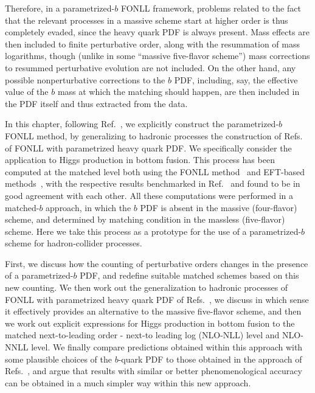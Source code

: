 Therefore, in a parametrized-$b$ FONLL framework, problems
related to the fact that the relevant processes in a massive scheme start
at higher order is thus completely
evaded, since the heavy quark 
PDF is always present. Mass effects are then included to finite
perturbative order, along with the resummation of mass logarithms, though
(unlike in some  ``massive five-flavor scheme'') mass corrections to
resummed perturbative evolution are not included. On the other hand,
any possible nonperturbative corrections to the $b$ PDF, including,
say, the effective value of the $b$ mass at which the matching should
happen, are then included in the PDF itself and thus extracted from
the data.

In this chapter, following Ref.~\cite{Forte:2019hjc}, we explicitly construct the parametrized-$b$ FONLL method, by
generalizing to hadronic processes the construction 
of Refs.~\cite{Ball:2015tna,Ball:2015dpa} of FONLL  with
parametrized heavy quark PDF. We specifically consider the
application to Higgs production in bottom fusion. This process has
been computed at the matched level both using the FONLL
method~\cite{Forte:2015hba,Forte:2016sja} and EFT-based
methods~\cite{Bonvini:2015pxa,Bonvini:2016fgf}, with the respective results
benchmarked in
Ref.~\cite{deFlorian:2016spz} and found to be in good agreement with
each other. All these computations were performed
in a matched-$b$ approach, in which the $b$ PDF  is absent in the
massive (four-flavor) scheme, and determined by matching condition in
the massless (five-flavor) scheme. Here we  take this process as
a prototype for the use of a parametrized-$b$  scheme
for hadron-collider processes.

First, we discuss how the counting of perturbative orders changes
in the presence of a parametrized-$b$ PDF, and redefine suitable
matched schemes based on this new counting. We  then work out the
generalization to hadronic processes of FONLL with
parametrized heavy quark PDF of Refs.~\cite{Ball:2015tna,Ball:2015dpa},
we discuss in which sense it effectively provides an alternative to the
massive five-flavor scheme, and then we work out explicit expressions for
Higgs production in bottom fusion to the matched next-to-leading order
- next-to leading log (NLO-NLL) level and NLO-NNLL level. We 
finally compare
predictions obtained within this approach with some plausible choices
of the $b$-quark PDF to those obtained in the approach of
Refs.~\cite{Forte:2015hba,Forte:2016sja}, and argue that results with
similar or better phenomenological accuracy can be obtained in a much
simpler way within this new approach.

